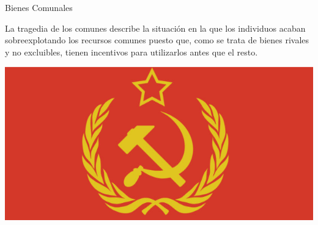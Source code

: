 \documentclass{beamer}
\begin{document}
\begin{frame}{Bienes Comunales}
    \begin{boxA}
        \centering
        La tragedia de los comunes describe la situación en la que los individuos acaban sobreexplotando los recursos comunes puesto que,
        como se trata de bienes rivales y no excluibles, tienen incentivos
        para utilizarlos antes que el resto.
    \end{boxA}
    \centering
    \includegraphics[scale=0.7]{../Figures/socialismo.png}
\end{frame}
\end{document}
